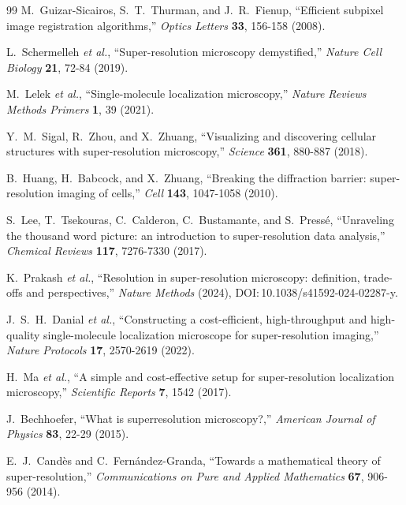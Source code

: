 \documentclass[11pt,a4paper]{article}
\begin{document}
\begin{thebibliography}{99}
 M.~Guizar-Sicairos, S.~T.~Thurman, and J.~R.~Fienup,
  ``Efficient subpixel image registration algorithms,'' \textit{Optics Letters}
  \textbf{33}, 156-158 (2008).

 L.~Schermelleh \textit{et al.}, ``Super-resolution
  microscopy demystified,'' \textit{Nature Cell Biology} \textbf{21}, 72-84
  (2019).

 M.~Lelek \textit{et al.}, ``Single-molecule localization
  microscopy,'' \textit{Nature Reviews Methods Primers} \textbf{1}, 39 (2021).

 Y.~M.~Sigal, R.~Zhou, and X.~Zhuang, ``Visualizing and
  discovering cellular structures with super-resolution microscopy,''
  \textit{Science} \textbf{361}, 880-887 (2018).

 B.~Huang, H.~Babcock, and X.~Zhuang, ``Breaking the
  diffraction barrier: super-resolution imaging of cells,'' \textit{Cell}
  \textbf{143}, 1047-1058 (2010).

 S.~Lee, T.~Tsekouras, C.~Calderon, C.~Bustamante, and
  S.~Press\'e, ``Unraveling the thousand word picture: an introduction to
  super-resolution data analysis,'' \textit{Chemical Reviews} \textbf{117},
  7276-7330 (2017).

 K.~Prakash \textit{et al.}, ``Resolution in
  super-resolution microscopy: definition, trade-offs and perspectives,''
  \textit{Nature Methods} (2024), DOI:\,10.1038/s41592-024-02287-y.

 J.~S.~H.~Danial \textit{et al.}, ``Constructing a
  cost-efficient, high-throughput and high-quality single-molecule localization
  microscope for super-resolution imaging,'' \textit{Nature Protocols}
  \textbf{17}, 2570-2619 (2022).

 H.~Ma \textit{et al.}, ``A simple and cost-effective setup for
  super-resolution localization microscopy,'' \textit{Scientific Reports}
  \textbf{7}, 1542 (2017).

 J.~Bechhoefer, ``What is superresolution
  microscopy?,'' \textit{American Journal of Physics} \textbf{83}, 22-29
  (2015).

 E.~J.~Cand\`es and C.~Fern\'andez-Granda, ``Towards a
  mathematical theory of super-resolution,'' \textit{Communications on Pure and
  Applied Mathematics} \textbf{67}, 906-956 (2014).

\end{thebibliography}
\end{document}
